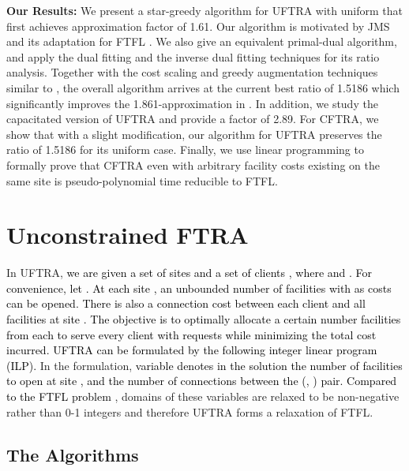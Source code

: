 \documentclass[10pt]{llncs}
\begin{document}
\textbf{Our Results:} We present a star-greedy algorithm for UFTRA
with uniform  that first achieves approximation factor
of 1.61. Our algorithm is motivated by JMS \cite{Jain03dualfitting}
and its adaptation for FTFL \cite{Swamy08FTFL2.076}. We also give
an equivalent primal-dual algorithm, and apply the dual fitting \cite{Jain03dualfitting}
and the inverse dual fitting \cite{shihongftfa} techniques for its
ratio analysis. Together with the cost scaling and greedy augmentation
techniques similar to \cite{Charikar051.7281.853,Mahdian021.52},
the overall algorithm arrives at the current best ratio of 1.5186
which significantly improves the 1.861-approximation in \cite{shihongftfa}.
In addition, we study the capacitated version of UFTRA and provide
a factor of 2.89. For CFTRA, we show that with a slight modification,
our algorithm for UFTRA preserves the ratio of 1.5186 for its uniform
case. Finally, we use linear programming to formally prove that CFTRA
even with arbitrary facility costs existing on the same site is pseudo-polynomial
time reducible to FTFL.


\section{Unconstrained FTRA }

In UFTRA,\textcolor{black}{{} we are given a set of sites 
and a set of clients , where 
and . For convenience, let .
At each site , an unbounded number of facilities
with  as costs can be opened. There is also a connection cost
 between each client  and all facilities
at site . The objective is to optimally allocate a certain number
facilities from each  to serve every client  with 
requests while minimizing the total cost incurred. UFTRA can be formulated
by the following integer linear program (ILP). }In the formulation,
\textcolor{black}{variable  denotes in the solution the number
of facilities to open at site , and  the number of connections
between the (, ) pair. Compared to the FTFL problem} \cite{Jain00FTFL},
domains of these variables are relaxed to be non-negative rather than
0-1 integers and therefore UFTRA forms a relaxation of FTFL.

{\small 
}{\small \par}


\subsection{The Algorithms}
\end{document}
